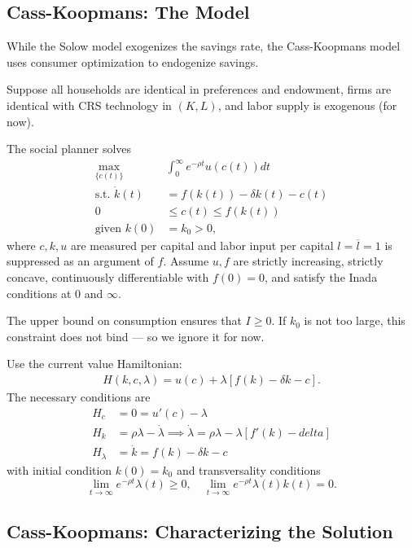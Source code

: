 \documentclass{tufte-handout}
\theoremstyle{definition}
\begin{document}
\subsection{Cass-Koopmans: The Model}

While the Solow model exogenizes the savings rate, the Cass-Koopmans model uses consumer optimization to endogenize savings.

Suppose all households are identical in preferences and endowment, firms are identical with CRS technology in $\left( K,L \right)$, and labor supply is exogenous (for now).

The social planner solves 
\begin{align*}
	\max_{\{c(t)\}} &\int_{0}^{\infty} e^{-\rho t}u(c(t)) dt \\
	\text{s.t. } \dot{k}(t) &= f(k(t)) - \delta k(t) - c(t) \\
	0 &\le c(t) \le f(k(t)) \\
	\text{given } k(0) &= k_0 > 0
,\end{align*}
where $c,k,u$ are measured per capital and labor input per capital $l = \overline{l} = 1$ is suppressed as an argument of $f$. Assume $u,f$ are strictly increasing, strictly concave, continuously differentiable with $f(0) = 0$, and satisfy the Inada conditions at $0$ and $\infty$.

The upper bound on consumption ensures that $I \ge 0$. If $k_0$ is not too large, this constraint does not bind --- so we ignore it for now.

Use the current value Hamiltonian:
\begin{align*}
	H(k,c,\lambda) = u(c) + \lambda \left[ f(k) -\delta k - c \right] 
.\end{align*} The necessary conditions are 
\begin{align*}
	H_c &= 0 = u'(c) - \lambda \\
	H_k &= \rho \lambda - \dot{\lambda} \implies \dot{\lambda} = \rho \lambda - \lambda\left[ f'(k) - delta \right] \\
	H_\lambda &= \dot{k} = f(k) - \delta k - c
\end{align*}
with initial condition $k(0) = k_0$ and transversality conditions \[
	\lim\limits_{t \to \infty} e^{-\rho t} \lambda(t) \ge 0, \quad \lim\limits_{t \to \infty} e^{-\rho t} \lambda(t) k(t) = 0
.\] 

\subsection{Cass-Koopmans: Characterizing the Solution}
\end{document}
